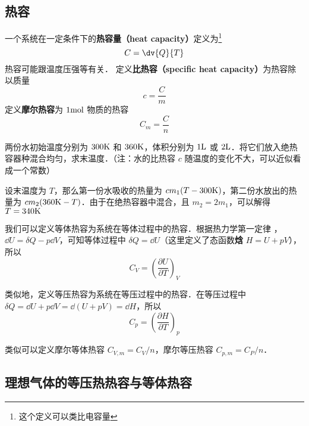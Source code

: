 
\begin{issues}
\issueTODO
\end{issues}
\subsection{热容}
一个系统在一定条件下的\textbf{热容量（heat capacity）}定义为\footnote{这个定义可以类比电容量}
\begin{equation}
C = \dv{Q}{T}
\end{equation}
热容可能跟温度压强等有关． 定义\textbf{比热容（specific heat capacity）}为热容除以质量
\begin{equation}
c = \frac{C}{m}
\end{equation}
定义\textbf{摩尔热容}为 $1 \rm{mol}$ 物质的热容
\begin{equation}
C_m=\frac{C}{n}
\end{equation}

\begin{example}{}
两份水初始温度分别为 $300\rm{K}$ 和 $360\rm{K}$，体积分别为 $1\rm{L}$ 或 $2 \rm{L}$．将它们放入绝热容器种混合均匀，求末温度．（注：水的比热容 $c$ 随温度的变化不大，可以近似看成一个常数）

设末温度为 $T$，那么第一份水吸收的热量为 $c m_1(T-300\rm{K})$，第二份水放出的热量为 $cm_2(360{\rm{K}}-T)$．由于在绝热容器中混合，且 $m_2=2m_1$，可以解得 $T=340\rm{K}$
\end{example}

我们可以定义等体热容为系统在等体过程中的热容．根据热力学第一定律 ，$\dd U=\delta Q-p\dd V$，可知等体过程中 $\delta Q=\dd U$（这里定义了态函数\textbf{焓} $H=U+pV$），所以
\begin{equation}\label{ThCapa_eq1}
C_V=\left(\frac{\partial U}{\partial T}\right)_V
\end{equation}

类似地，定义等压热容为系统在等压过程中的热容．在等压过程中 $\delta Q=\dd U+p\dd V=\dd (U+pV)=\dd H$，所以
\begin{equation}\label{ThCapa_eq2}
C_p=\left(\frac{\partial H}{\partial T}\right)_p
\end{equation}

类似可以定义摩尔等体热容 $C_{V,m}=C_V/n$，摩尔等压热容 $C_{p,m}=C_P/n$．

\subsection{理想气体的等压热热容与等体热容}

